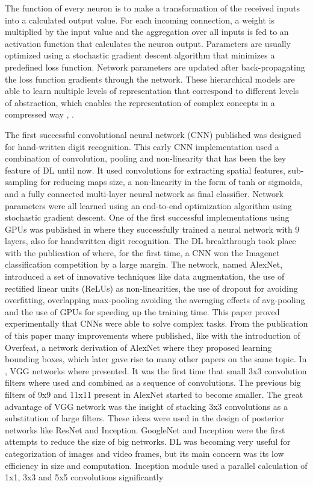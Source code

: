 The function of every neuron is to make a transformation of the received inputs into a calculated output value. For each incoming connection, a weight is multiplied by the input value and the aggregation over all inputs is fed to an activation function that calculates the neuron output. Parameters are usually optimized using a stochastic gradient descent algorithm that minimizes a predefined loss function. Network parameters are updated after back-propagating the loss function gradients through the network. These hierarchical models are able to learn multiple levels of representation that correspond to different levels of abstraction, which enables the representation of complex concepts in a compressed way \citep{Bengio:2013:RLR:2498740.2498889}, \citep{bengio-2009}.

The first successful convolutional neural network (CNN) published \citep{LeCun:98} was designed for hand-written digit recognition. This early CNN implementation used a combination of convolution, pooling and non-linearity that has been the key feature of DL until now. It used convolutions for extracting spatial features, sub-sampling for reducing maps size, a non-linearity in the form of tanh or sigmoids, and a fully connected multi-layer neural network as final classifier.  Network parameters were all learned using an end-to-end optimization algorithm using stochastic gradient descent. One of the first successful implementations using GPUs was published in \citep{ciresan80deep} where they successfully trained a neural network with 9 layers, also for handwritten digit recognition. The DL breakthrough took place with the publication of \citep{NIPS2012_4824} where, for the first time, a CNN won the Imagenet\citep{imagenet_cvpr09} classification competition by a large margin. The network, named AlexNet, introduced a set of innovative techniques like data augmentation, the use of rectified linear units (ReLUs) as non-linearities, the use of dropout for avoiding overfitting, overlapping max-pooling avoiding the averaging effects of avg-pooling and the use of GPUs for speeding up the training time. This paper proved experimentally that CNNs were able to solve complex tasks. From the publication of this paper many improvements where published, like \citep{sermanet2014overfeat} with the introduction of Overfeat, a network derivation of AlexNet where they proposed learning bounding boxes, which later gave rise to many other papers on the same topic. In \citep{vggnet}, VGG networks where presented. It was the first time that small 3x3 convolution filters where used and combined as a sequence of convolutions. The previous big filters of 9x9 and 11x11 present in AlexNet started to become smaller. The great advantage of VGG network was the insight of stacking 3x3 convolutions as a substitution of large filters. These ideas were used in the design of posterior networks like ResNet and Inception. GoogleNet\citep{googlenet} and Inception \citep{szegedy2016rethinking} were the first attempts to reduce the size of big networks. DL was becoming very useful for categorization of images and video frames, but its main concern was its low efficiency in size and computation. Inception module used a parallel calculation of 1x1, 3x3 and 5x5 convolutions significantly 